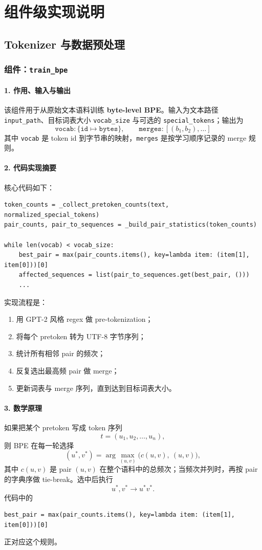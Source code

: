 \documentclass[UTF8,a4paper,11pt]{ctexart}
\begin{document}
\newpage
\section{组件级实现说明}

\subsection{Tokenizer 与数据预处理}

\subsubsection{组件：\texttt{train\_bpe}}
\paragraph{1. 作用、输入与输出}
该组件用于从原始文本语料训练 \textbf{byte-level BPE}。输入为文本路径 \texttt{input\_path}、目标词表大小 \texttt{vocab\_size} 与可选的 \texttt{special\_tokens}；输出为
\[
\texttt{vocab}: \{ \texttt{id} \mapsto \texttt{bytes} \}, \qquad
\texttt{merges}: [(b_1,b_2), \dots]
\]
其中 \texttt{vocab} 是 token id 到字节串的映射，\texttt{merges} 是按学习顺序记录的 merge 规则。

\paragraph{2. 代码实现摘要}
核心代码如下：
\begin{lstlisting}
token_counts = _collect_pretoken_counts(text, normalized_special_tokens)
pair_counts, pair_to_sequences = _build_pair_statistics(token_counts)

while len(vocab) < vocab_size:
    best_pair = max(pair_counts.items(), key=lambda item: (item[1], item[0]))[0]
    affected_sequences = list(pair_to_sequences.get(best_pair, ()))
    ...
\end{lstlisting}
实现流程是：
\begin{enumerate}[leftmargin=2em]
  \item 用 GPT-2 风格 regex 做 pre-tokenization；
  \item 将每个 pretoken 转为 UTF-8 字节序列；
  \item 统计所有相邻 pair 的频次；
  \item 反复选出最高频 pair 做 merge；
  \item 更新词表与 merge 序列，直到达到目标词表大小。
\end{enumerate}

\paragraph{3. 数学原理}
如果把某个 pretoken 写成 token 序列
\[
t = (u_1, u_2, \dots, u_n),
\]
则 BPE 在每一轮选择
\[
(u^\ast, v^\ast) = \arg\max_{(u,v)} \Big( c(u,v),\ (u,v) \Big),
\]
其中 \(c(u,v)\) 是 pair \((u,v)\) 在整个语料中的总频次；当频次并列时，再按 pair 的字典序做 tie-break。选中后执行
\[
u^\ast, v^\ast \longrightarrow u^\ast v^\ast.
\]
代码中的
\begin{lstlisting}
best_pair = max(pair_counts.items(), key=lambda item: (item[1], item[0]))[0]
\end{lstlisting}
正对应这个规则。
\end{document}
